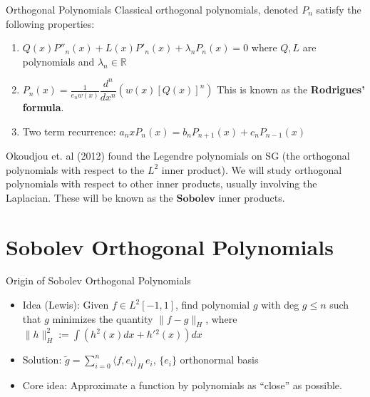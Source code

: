 \documentclass[xcolor = dvipsnames]{beamer}
\begin{document}
\begin{frame}{Orthogonal Polynomials}
    Classical orthogonal polynomials, denoted $P_n$ satisfy the following properties:
    \pause
    \begin{enumerate}
        \item $Q(x)P''_n(x) + L(x)P'_n(x) + \lambda_nP_n(x) = 0$ where $Q,L$ are polynomials and $\lambda_n \in \mathbb{R}$
        \pause
        \item $P_n(x) = \frac{1}{e_nw(x)}\dfrac{d^n}{dx^n}(w(x)[Q(x)]^n)$ This is known as the \textbf{Rodrigues' formula}.
        \pause
        \item Two term recurrence: $a_nxP_{n}(x) = b_nP_{n+1}(x) + c_nP_{n-1}(x)$
    \end{enumerate}
    \pause
    Okoudjou et. al (2012) found the Legendre polynomials on SG (the orthogonal polynomials with respect to the $L^2$ inner product). 
    We will study orthogonal polynomials with respect to other inner products, usually involving the Laplacian. These will be known as the $\textbf{Sobolev}$ inner products. 
\end{frame}%

\section{Sobolev Orthogonal Polynomials}
\begin{frame}{Origin of Sobolev Orthogonal Polynomials}
    \begin{itemize}
        \item Idea (Lewis): Given $f \in L^2[-1,1]$, find polynomial $g$ with deg $g\le n$ such that $g$ minimizes the quantity $\|f-g\|_{H}$, where $\|h\|_{H}^2:=\int (h^2(x)dx+h'{^2}(x))dx$
        \pause
        \item Solution: $\widetilde g=\sum\limits^{n}_{i=0} \langle f,e_i\rangle_H\,e_i$, $\{e_i\}$ orthonormal basis
        \pause
        \item Core idea: Approximate a function by polynomials as “close” as possible.

    \end{itemize}
\end{frame}
\end{document}
